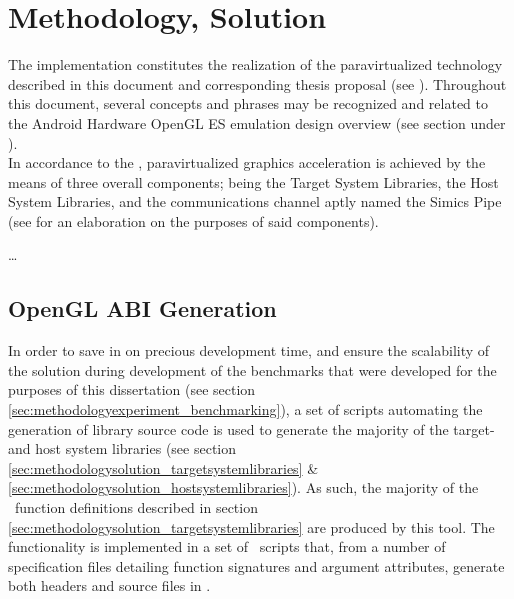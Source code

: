 
\chapter{Methodology, Solution}
\label{cha:methodologysolution}
The implementation constitutes the realization of the paravirtualized technology described in this document and corresponding thesis proposal (see ).
Throughout this document, several concepts and phrases may be recognized and related to the Android Hardware OpenGL ES emulation design overview (see section  under ).\\

\noindent
In accordance to the \dvttermreferenceimplementation , paravirtualized graphics acceleration is achieved by the means of three overall components; being the Target System Libraries, the Host System Libraries, and the communications channel aptly named the Simics Pipe (see  for an elaboration on the purposes of said components).



\ldots


\section{OpenGL ABI Generation}
\label{sec:methodologysolution_openglabigeneration}
In order to save in on precious development time, and ensure the scalability of the solution during development of the benchmarks that were developed for the purposes of this dissertation (see section \ref{sec:methodologyexperiment_benchmarking}), a set of scripts automating the generation of library source code is used to generate the majority of the target- and host system libraries (see section \ref{sec:methodologysolution_targetsystemlibraries} \& \ref{sec:methodologysolution_hostsystemlibraries}).
As such, the majority of the \dvttermopengl\ function definitions described in section \ref{sec:methodologysolution_targetsystemlibraries} are produced by this tool.
The functionality is implemented in a set of \dvttermpython\ scripts that, from a number of specification files detailing function signatures and argument attributes, generate both headers and source files in \dvttermc .

